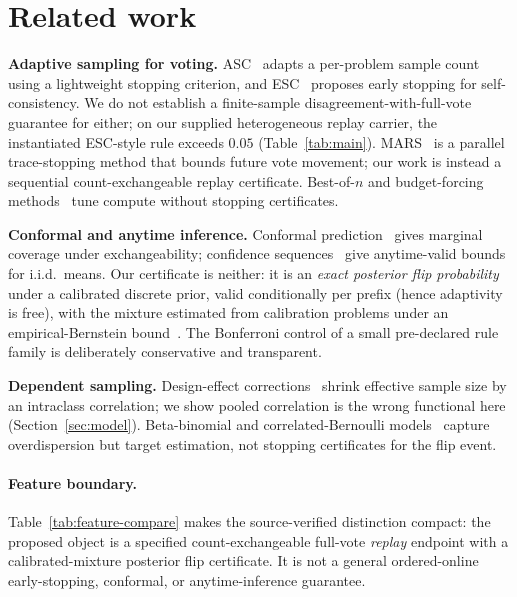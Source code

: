 \documentclass{article}
\theoremstyle{definition}
\theoremstyle{remark}
\begin{document}
\section{Related work}
\label{sec:related}

\textbf{Adaptive sampling for voting.} ASC~\citep{aggarwal2023asc} adapts a
per-problem sample count using a lightweight stopping criterion, and
ESC~\citep{li2024esc} proposes early stopping for self-consistency. We do not
establish a finite-sample disagreement-with-full-vote guarantee for either;
on our supplied heterogeneous replay carrier, the instantiated ESC-style rule
exceeds $0.05$ (Table~\ref{tab:main}). MARS~\citep{chen2026mars} is a
parallel trace-stopping method that bounds future vote movement; our work is
instead a sequential count-exchangeable replay certificate. Best-of-$n$ and budget-forcing
methods~\citep{snell2024scaling} tune compute without stopping certificates.

\textbf{Conformal and anytime inference.} Conformal
prediction~\citep{vovk2005algorithmic} gives marginal coverage under
exchangeability; confidence sequences~\citep{howard2021cs} give anytime-valid
bounds for i.i.d.\ means. Our certificate is neither: it is an \emph{exact
posterior flip probability} under a calibrated discrete prior, valid
conditionally per prefix (hence adaptivity is free), with the mixture
estimated from calibration problems under an empirical-Bernstein
bound~\citep{maurer2009eb}. The Bonferroni control of a small pre-declared
rule family is deliberately conservative and transparent.

\textbf{Dependent sampling.} Design-effect corrections~\citep{kish1965deff}
shrink effective sample size by an intraclass correlation; we show pooled
correlation is the wrong functional here (Section~\ref{sec:model}).
Beta-binomial and correlated-Bernoulli
models~\citep{skellam1948betabinomial} capture overdispersion but target
estimation, not stopping certificates for the flip event.

\paragraph{Feature boundary.} Table~\ref{tab:feature-compare} makes the
source-verified distinction compact: the proposed object is a specified
count-exchangeable full-vote \emph{replay} endpoint with a calibrated-mixture
posterior flip certificate. It is not a general ordered-online early-stopping,
conformal, or anytime-inference guarantee.
\end{document}
